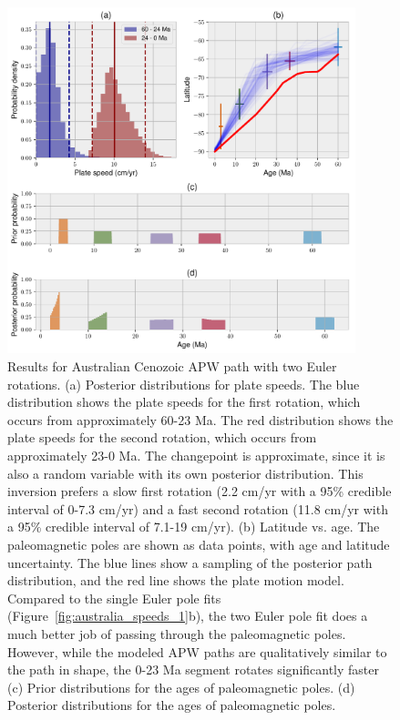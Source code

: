 \documentclass[preprint,12pt,authoryear]{elsarticle}
\begin{document}
\begin{figure}
\includegraphics[width=0.9\textwidth]{figures/australia/australia_speeds_2.pdf}
\caption[Results for Australian Cenozoic APW path with two Euler rotations.]{Results for Australian Cenozoic APW path with two Euler rotations. 
(a) Posterior distributions for plate speeds. The blue distribution shows the plate speeds for the first rotation, which occurs from approximately 60-23 Ma. The red distribution shows the plate speeds for the second rotation, which occurs from approximately 23-0 Ma. The changepoint is approximate, since it is also a random variable with its own posterior distribution. This inversion prefers a slow first rotation (2.2 cm/yr with a 95\% credible interval of 0-7.3 cm/yr) and a fast second rotation (11.8 cm/yr with a 95\% credible interval of 7.1-19 cm/yr).
(b) Latitude vs. age. The paleomagnetic poles are shown as data points, with age and latitude uncertainty. The blue lines show a sampling of the posterior path distribution, and the red line shows the \citet{seton2012global} plate motion model. Compared to the single Euler pole fits (Figure~\ref{fig:australia_speeds_1}b), the two Euler pole fit does a much better job of passing through the paleomagnetic poles. However, while the modeled APW paths are qualitatively similar to the \citet{seton2012global} path in shape, the 0-23 Ma segment rotates significantly faster
(c) Prior distributions for the ages of paleomagnetic poles.
(d) Posterior distributions for the ages of paleomagnetic poles.}
\label{fig:australia_speeds_2}
\end{figure}
\end{document}
